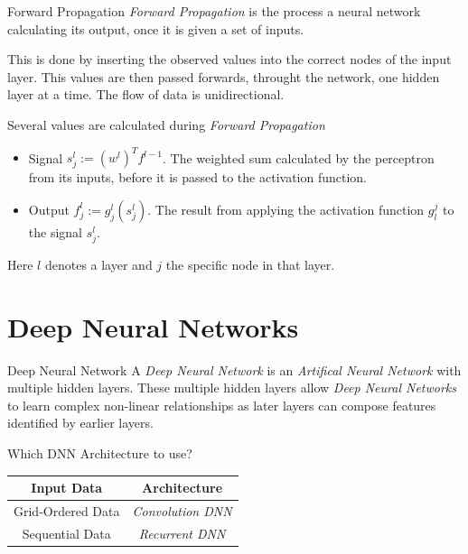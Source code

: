 \documentclass[11pt,a4paper]{article}
\begin{document}
  \begin{definition}{Forward Propagation}
    \textit{Forward Propagation} is the process a neural network calculating its output, once it is given a set of inputs.
    \par This is done by inserting the observed values into the correct nodes of the input layer. This values are then passed forwards, throught the network, one hidden layer at a time. The flow of data is unidirectional.
    \par Several values are calculated during \textit{Forward Propagation}
    \begin{itemize}
      \item Signal $s_j^l:=(w^l)^Tf^{l-1}$. The weighted sum calculated by the perceptron from its inputs, before it is passed to the activation function.
      \item Output $f_j^l:=g_j^l(s_j^l)$. The result from applying the activation function $g^j_l$ to the signal $s_j^l$.
    \end{itemize}
    Here $l$ denotes a layer and $j$ the specific node in that layer.
  \end{definition}

\section{Deep Neural Networks} \label{sec_DeepNeuralNetworks}

  \begin{definition}{Deep Neural Network}
    A \textit{Deep Neural Network} is an \textit{Artifical Neural Network} with multiple hidden layers. These multiple hidden layers allow \textit{Deep Neural Networks} to learn complex non-linear relationships as later layers can compose features identified by earlier layers.
  \end{definition}

  \begin{remark}{Which DNN Architecture to use?}
    \begin{center}
      \begin{tabular}{|c|c|}
        \hline
        \textbf{Input Data}&\textbf{Architecture}\\\hline
        Grid-Ordered Data&\textit{Convolution DNN}\\\hline
        Sequential Data&\textit{Recurrent DNN}\\\hline
      \end{tabular}
    \end{center}
  \end{remark}
\end{document}
